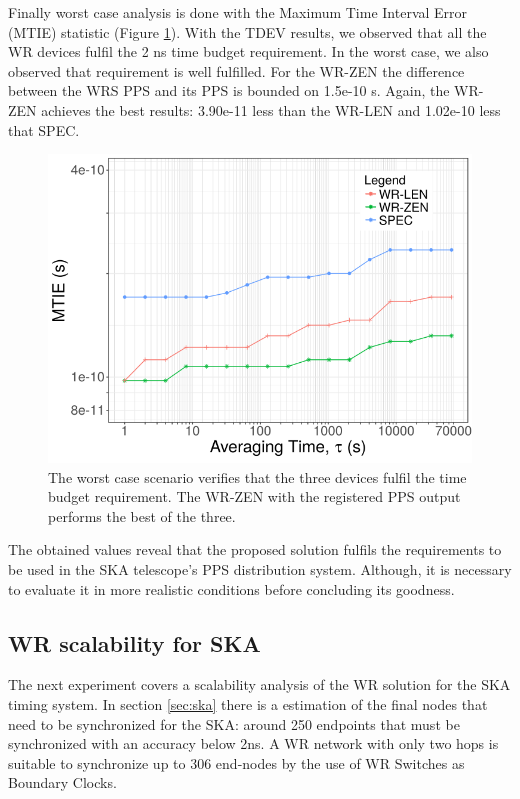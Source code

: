 Finally worst case analysis is done with the Maximum Time Interval Error (MTIE) 
statistic (Figure \ref{fig:mtie_exp1}). With the TDEV results, we observed that 
all the WR devices fulfil the 2 ns time budget requirement. In the worst case, 
we also observed that requirement is well fulfilled. For the WR-ZEN the 
difference between the WRS PPS and its PPS is bounded on 1.5e-10 s. Again, the 
WR-ZEN achieves the best results: 3.90e-11 less than the WR-LEN and 1.02e-10 less that 
SPEC.

\begin{figure}
	\centering
	\includegraphics[width=0.7\linewidth]{img/mtie_exp1}
	\caption[MTIE for the WR devices comparison.]{The worst case scenario 
	verifies that the three devices fulfil the time budget requirement. The 
	WR-ZEN with the registered PPS output performs the best of the three.}
	\label{fig:mtie_exp1}
\end{figure}


The obtained values reveal that the proposed solution fulfils the requirements 
to be used in the SKA telescope's PPS distribution system. Although, it is 
necessary to evaluate it in more realistic conditions before concluding its 
goodness.

\subsection{WR scalability for SKA}
\label{subsec: net_exp}

The next experiment covers a scalability analysis of the WR solution for the 
SKA timing system. In section \ref{sec:ska} there is a estimation of the final 
nodes that need to be synchronized for the SKA: around 250 endpoints that 
must be synchronized with an accuracy below 2ns. A WR network with only two 
hops is suitable to synchronize up to 306 end-nodes by the use of WR Switches as 
Boundary Clocks.

